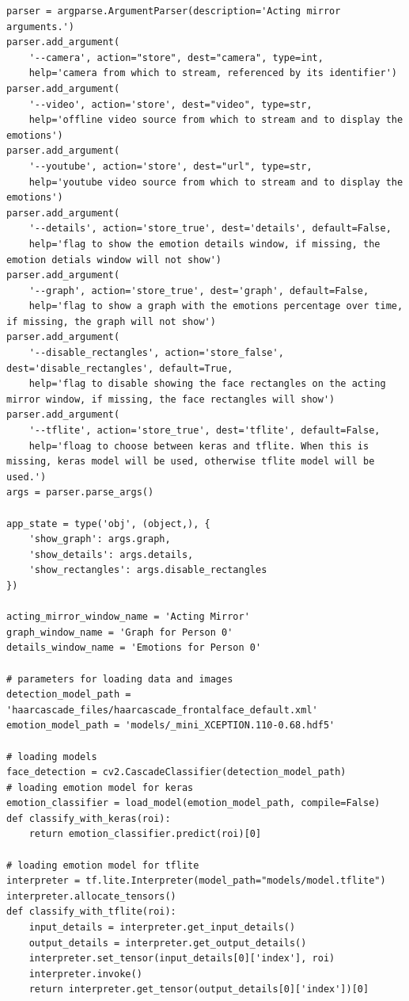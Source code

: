 \documentclass[runningheads,a4paper,11pt]{report}
\begin{document}
\begin{appendices}
\begin{lstlisting}
parser = argparse.ArgumentParser(description='Acting mirror arguments.')
parser.add_argument(
    '--camera', action="store", dest="camera", type=int, 
    help='camera from which to stream, referenced by its identifier')
parser.add_argument(
    '--video', action='store', dest="video", type=str, 
    help='offline video source from which to stream and to display the emotions')
parser.add_argument(
    '--youtube', action='store', dest="url", type=str, 
    help='youtube video source from which to stream and to display the emotions')
parser.add_argument(
    '--details', action='store_true', dest='details', default=False, 
    help='flag to show the emotion details window, if missing, the emotion detials window will not show')
parser.add_argument(
    '--graph', action='store_true', dest='graph', default=False, 
    help='flag to show a graph with the emotions percentage over time, if missing, the graph will not show')
parser.add_argument(
    '--disable_rectangles', action='store_false', dest='disable_rectangles', default=True, 
    help='flag to disable showing the face rectangles on the acting mirror window, if missing, the face rectangles will show')
parser.add_argument(
    '--tflite', action='store_true', dest='tflite', default=False, 
    help='floag to choose between keras and tflite. When this is missing, keras model will be used, otherwise tflite model will be used.')
args = parser.parse_args()

app_state = type('obj', (object,), {
    'show_graph': args.graph,
    'show_details': args.details,
    'show_rectangles': args.disable_rectangles
})

acting_mirror_window_name = 'Acting Mirror'
graph_window_name = 'Graph for Person 0'
details_window_name = 'Emotions for Person 0'

# parameters for loading data and images
detection_model_path = 'haarcascade_files/haarcascade_frontalface_default.xml'
emotion_model_path = 'models/_mini_XCEPTION.110-0.68.hdf5'

# loading models
face_detection = cv2.CascadeClassifier(detection_model_path)
# loading emotion model for keras
emotion_classifier = load_model(emotion_model_path, compile=False)
def classify_with_keras(roi):
    return emotion_classifier.predict(roi)[0]

# loading emotion model for tflite
interpreter = tf.lite.Interpreter(model_path="models/model.tflite")
interpreter.allocate_tensors()
def classify_with_tflite(roi):
    input_details = interpreter.get_input_details()
    output_details = interpreter.get_output_details()
    interpreter.set_tensor(input_details[0]['index'], roi)
    interpreter.invoke()
    return interpreter.get_tensor(output_details[0]['index'])[0]


\end{lstlisting}
\end{appendices}
\end{document}
